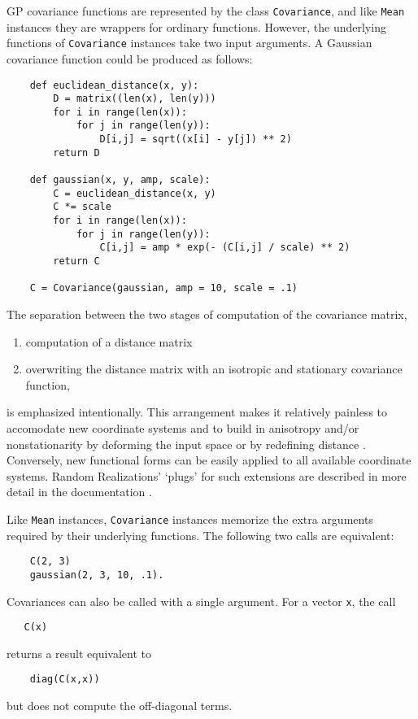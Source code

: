\documentclass{report}
\begin{document}
GP covariance functions are represented by the class \texttt{Covariance}, and like \texttt{Mean} instances they are wrappers for ordinary functions. However, the underlying functions of \texttt{Covariance} instances take two input arguments. A Gaussian covariance function could be produced as follows:
\begin{verbatim}
    def euclidean_distance(x, y):
        D = matrix((len(x), len(y)))
        for i in range(len(x)):
            for j in range(len(y)):
                D[i,j] = sqrt((x[i] - y[j]) ** 2)
        return D

    def gaussian(x, y, amp, scale):
        C = euclidean_distance(x, y)
        C *= scale
        for i in range(len(x)):
            for j in range(len(y)):
                C[i,j] = amp * exp(- (C[i,j] / scale) ** 2)
        return C

    C = Covariance(gaussian, amp = 10, scale = .1)
\end{verbatim}
The separation between the two stages of computation of the covariance matrix,
\begin{enumerate}
    \item computation of a distance matrix
    \item overwriting the distance matrix with an isotropic and stationary covariance function,
\end{enumerate}
is emphasized intentionally. This arrangement makes it relatively painless to accomodate new coordinate systems and to build in anisotropy and/or nonstationarity by deforming the input space \cite{sampson} or by redefining distance \cite{pachische}. Conversely, new functional forms can be easily applied to all available coordinate systems. Random Realizations' `plugs' for such extensions are described in more detail in the documentation \cite{me_SR}.


Like \texttt{Mean} instances, \texttt{Covariance} instances memorize the extra arguments required by their underlying functions. The following two calls are equivalent:
\begin{verbatim}
    C(2, 3)
    gaussian(2, 3, 10, .1).
\end{verbatim}
Covariances can also be called with a single argument. For a vector \texttt{x}, the call
\begin{verbatim}
   C(x)
\end{verbatim}
returns a result equivalent to
\begin{verbatim}
    diag(C(x,x))
\end{verbatim}
but does not compute the off-diagonal terms.
\end{document}
